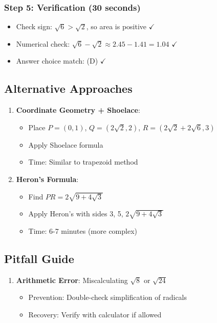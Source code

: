 \documentclass[]{article}
\begin{document}
\begin{solutionbox}
\subsubsection*{Step 5: Verification (30 seconds)}
\begin{itemize}[leftmargin=*]
    \item Check sign: $\sqrt{6} > \sqrt{2}$, so area is positive $\checkmark$
    \item Numerical check: $\sqrt{6} - \sqrt{2} \approx 2.45 - 1.41 = 1.04$ $\checkmark$
    \item Answer choice match: (D) $\checkmark$
\end{itemize}

\subsection*{Alternative Approaches}
\begin{enumerate}[leftmargin=*]
    \item \textbf{Coordinate Geometry + Shoelace}:
    \begin{itemize}
        \item Place $P = (0,1)$, $Q = (2\sqrt{2}, 2)$, $R = (2\sqrt{2}+2\sqrt{6}, 3)$
        \item Apply Shoelace formula
        \item Time: Similar to trapezoid method
    \end{itemize}
    
    \item \textbf{Heron's Formula}:
    \begin{itemize}
        \item Find $PR = 2\sqrt{9+4\sqrt{3}}$
        \item Apply Heron's with sides 3, 5, $2\sqrt{9+4\sqrt{3}}$
        \item Time: 6-7 minutes (more complex)
    \end{itemize}
\end{enumerate}

\subsection*{Pitfall Guide}
\begin{enumerate}[leftmargin=*]
    \item \textbf{Arithmetic Error}: Miscalculating $\sqrt{8}$ or $\sqrt{24}$
    \begin{itemize}
        \item Prevention: Double-check simplification of radicals
        \item Recovery: Verify with calculator if allowed
    \end{itemize}
    

\end{enumerate}
\end{solutionbox}
\end{document}
